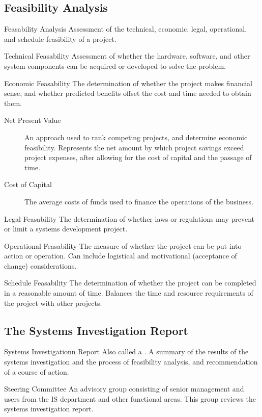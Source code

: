 \documentclass[\main/notes.tex]{subfiles}
\begin{document}
			\subsection{Feasibility Analysis}
				\begin{definition}{Feasability Analysis}
					Assessment of the technical, economic, legal, operational, and schedule feasibility of a project.
				\end{definition}
				\begin{definition}{Technical Feasability}
					Assessment of whether the hardware, software, and other system components can be acquired or developed to solve the problem.
				\end{definition}
				\begin{definition}{Economic Feasability}
					The determination of whether the project makes financial sense, and whether predicted benefits offset the cost and time needed to obtain them.
					\begin{description}
						\item[Net Present Value] An approach used to rank competing projects, and determine economic feasibility. Represents the net amount by which project savings exceed project expenses, after allowing for the cost of capital and the passage of time.
						\item[Cost of Capital] The average costs of funds used to finance the operations of the business.
					\end{description}
				\end{definition}
				\begin{definition}{Legal Feasability}
					The determination of whether laws or regulations may prevent or limit a systems development project.
				\end{definition}
				\begin{definition}{Operational Feasability}
					The measure of whether the project can be put into action or operation. Can include logistical and motivational (acceptance of change) considerations.
				\end{definition}
				\begin{definition}{Schedule Feasability}
					The determination of whether the project can be completed in a reasonable amount of time. Balances the time and resource requirements of the project with other projects.
				\end{definition}
			\subsection{The Systems Investigation Report}
				\begin{definition}{Systems Investigationn Report}
					Also called a . A summary of the results of the systems investigation and the process of feasibility analysis, and recommendation of a course of action.
				\end{definition}
				\begin{definition}{Steering Committee}
					An advisory group consisting of senior management and users from the IS department and other functional areas. This group reviews the systems investigation report.
				\end{definition}
\end{document}
